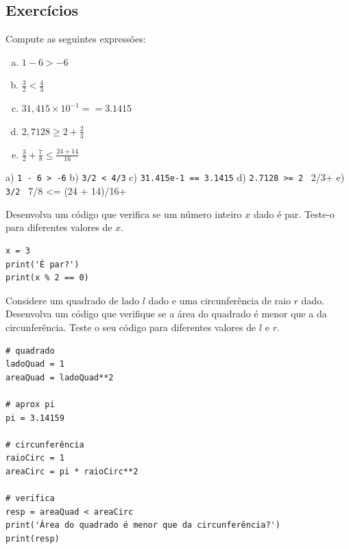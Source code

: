 \subsection{Exercícios}

\begin{exer}
  Compute as seguintes expressões:
  \begin{enumerate}[a)]
  \item $1 - 6 > -6$\\
  \item $\frac{3}{2} < \frac{4}{3}$\\
  \item $31,415\times 10^{-1} == 3.1415$\\
  \item $\displaystyle 2,7128 \geq 2 + \frac{2}{3}$
  \item $\displaystyle \frac{3}{2} + \frac{7}{8} \leq \frac{24 + 14}{16}$
  \end{enumerate}
\end{exer}
\begin{resp}
  a) \lstinline+1 - 6 > -6+ b) \lstinline+3/2 < 4/3+ c) \lstinline+31.415e-1 == 3.1415+ d) \lstinline+2.7128 >= 2 + 2/3+ e) \lstinline+3/2 + 7/8 <= (24 + 14)/16+
\end{resp}

\begin{exer}
  Desenvolva um código que verifica se um número inteiro $x$ dado é par. Teste-o para diferentes valores de $x$.
\end{exer}
\begin{resp}

\begin{lstlisting}
x = 3
print('É par?')
print(x % 2 == 0)
\end{lstlisting}

\end{resp}

\begin{exer}
  Considere um quadrado de lado $l$ dado e uma circunferência de raio $r$ dado. Desenvolva um código que verifique se a área do quadrado é menor que a da circunferência. Teste o seu código para diferentes valores de $l$ e $r$.
\end{exer}
\begin{resp}

\begin{lstlisting}
# quadrado
ladoQuad = 1
areaQuad = ladoQuad**2

# aprox pi
pi = 3.14159

# circunferência
raioCirc = 1
areaCirc = pi * raioCirc**2

# verifica
resp = areaQuad < areaCirc
print('Área do quadrado é menor que da circunferência?')
print(resp)
\end{lstlisting}

\end{resp}

